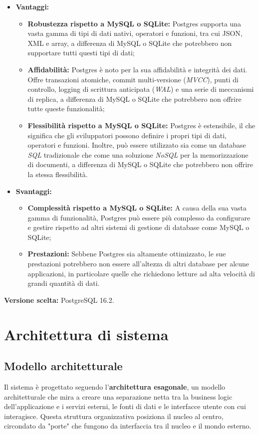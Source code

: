 \documentclass[10pt, a4paper]{article}
\begin{document}
\begin{itemize}
\item \textbf{Vantaggi:}
\begin{itemize}
\item \textbf{Robustezza rispetto a MySQL o SQLite:} Postgres supporta una vasta gamma di tipi di dati nativi, operatori e funzioni, tra cui JSON, XML e array, a differenza di MySQL o SQLite che potrebbero non supportare tutti questi tipi di dati;
\item \textbf{Affidabilità:} Postgres è noto per la sua affidabilità e integrità dei dati. Offre transazioni atomiche, commit multi-versione (\textit{MVCC\pg}), punti di controllo, logging di scrittura anticipata (\textit{WAL\pg}) e una serie di meccanismi di replica, a differenza di MySQL o SQLite che potrebbero non offrire tutte queste funzionalità;
\item \textbf{Flessibilità rispetto a MySQL o SQLite:} Postgres è estensibile, il che significa che gli sviluppatori possono definire i propri tipi di dati, operatori e funzioni. Inoltre, può essere utilizzato sia come un database \textit{SQL\pg} tradizionale che come una soluzione \textit{NoSQL\pg} per la memorizzazione di documenti, a differenza di MySQL o SQLite che potrebbero non offrire la stessa flessibilità.
\end{itemize}
\item \textbf{Svantaggi:}
\begin{itemize}
\item \textbf{Complessità rispetto a MySQL o SQLite:} A causa della sua vasta gamma di funzionalità, Postgres può essere più complesso da configurare e gestire rispetto ad altri sistemi di gestione di database come MySQL o SQLite;
\item \textbf{Prestazioni:} Sebbene Postgres sia altamente ottimizzato, le sue prestazioni potrebbero non essere all'altezza di altri database per alcune applicazioni, in particolare quelle che richiedono letture ad alta velocità di grandi quantità di dati.
\end{itemize}
\end{itemize}
\textbf{Versione scelta:} PostgreSQL 16.2.

\newpage
\section{Architettura di sistema}
\subsection{Modello architetturale}
Il sistema è progettato seguendo l'\textbf{architettura esagonale}, un modello architetturale che mira a creare una separazione netta tra la business logic dell'applicazione e i servizi esterni, le fonti di dati e le interfacce utente con cui interagisce.
Questa struttura organizzativa posiziona il nucleo al centro, circondato da "porte" che fungono da interfaccia tra il nucleo e il mondo esterno.
\end{document}
